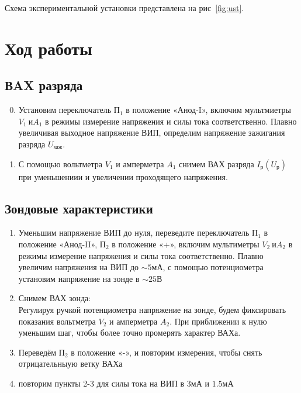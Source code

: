 \documentclass[11pt,a4paper]{article}
\begin{document}
\noindent Схема экспериментальной установки представлена на рис~\ref{fig:ust}.
  
\section*{Ход работы}
\subsection*{ВAX разряда}
\begin{enumerate}
  \setcounter{enumi}{-1}
  \item Установим переключатель $П_1$ в положение «Анод-I», включим
  мультмиетры $V_1\ и A_1$ в режимы измерение напряжения и силы тока соответственно.
  Плав­но увеличивая выходное напряжение ВИП, определим
  напряжение зажигания разряда $U_\text{заж}$.
  \item С помощью вольтметра $V_1$ и амперметра $A_1$ снимем 
  ВАХ разряда $I_\text{р}(U_\text{р})$ при уменьшениии и увеличении 
  проходящего напряжения.
\end{enumerate}

\subsection*{Зондовые характеристики}
\begin{enumerate}
  \item Уменьшим напряжение ВИП до нуля, переведите переключатель $П_1$
  в положение «Анод-II», $П_2$ в положение «+», 
  включим мультиметры  $V_2\ и A_2$ в режимы 
  измерение напряжения и силы тока соответственно. Плавно увеличим 
  напряжения на ВИП до $\sim5мА$, с помощью потенциометра
  установим напряжение на зонде в $\sim25В$
  \item Снимем ВАХ зонда:\\
  Регулируя ручкой потенциометра напряжение на зонде,
  будем фиксировать показания вольтметра $V_2$ и амперметра $A_2$.
  При приближении к нулю уменьшим шаг, чтобы более точно
  промерять характер ВАХа.
  \item Переведём  $П_2$ в положение «-», и повторим измерения, 
  чтобы снять отрицательныую ветку ВАХа
  \item повторим пункты 2-3 для силы тока на ВИП в $3мА$ и $1.5мА$
\end{enumerate}
\end{document}
